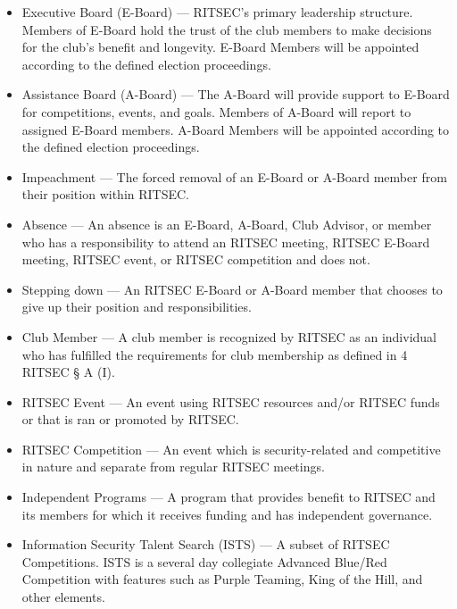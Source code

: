 \begin{itemize}
      \item Executive Board (E-Board) --- RITSEC's primary leadership structure. Members of
            E-Board hold the trust of the club members to make decisions for the club's
            benefit and longevity. E-Board Members will be appointed according to the
            defined election proceedings.

      \item Assistance Board (A-Board) --- The A-Board will provide support to E-Board for
            competitions, events, and goals. Members of A-Board will report to assigned
            E-Board members. A-Board Members will be appointed according to the defined
            election proceedings.

      \item Impeachment --- The forced removal of an E-Board or A-Board member from their
            position within RITSEC\@.

      \item Absence --- An absence is an E-Board, A-Board, Club Advisor, or member who has
            a responsibility to attend an RITSEC meeting, RITSEC E-Board meeting, RITSEC
            event, or RITSEC competition and does not.

      \item Stepping down --- An RITSEC E-Board or A-Board member that chooses to give up
            their position and responsibilities.

      \item Club Member --- A club member is recognized by RITSEC as an individual who has
            fulfilled the requirements for club membership as defined in 4 RITSEC § A (I).

      \item RITSEC Event --- An event using RITSEC resources and/or RITSEC funds or that is
            ran or promoted by RITSEC\@.

      \item RITSEC Competition --- An event which is security-related and competitive in
            nature and separate from regular RITSEC meetings.

      \item Independent Programs --- A program that provides benefit to RITSEC and its
            members for which it receives funding and has independent governance.

      \item Information Security Talent Search (ISTS) --- A subset of RITSEC Competitions.
            ISTS is a several day collegiate Advanced Blue/Red Competition with features
            such as Purple Teaming, King of the Hill, and other elements.


\end{itemize}

